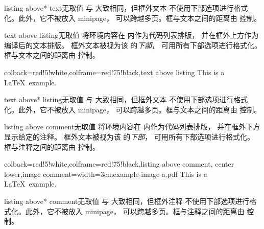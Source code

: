 \begin{docTcbKey}[][doc new=2014-11-07]{listing above* text}{}{无取值}
  与  大致相同，但框外文本
  不使用下部选项进行格式化。此外，它不被放入 minipage，
  可以跨越多页。框与文本之间的距离由  控制。
\end{docTcbKey}

\clearpage

\begin{docTcbKey}{text above listing}{}{无取值}
  将环境内容在  内作为代码列表排版，
  并在框外上方作为编译后的文本排版。
  框外文本被视为该  的\emph{下部}，
  可用所有下部选项进行格式化。
  框与文本之间的距离由  控制。
\begin{dispExample}
\begin{tcblisting}{colback=red!5!white,colframe=red!75!black,text above listing}
This is a \LaTeX\ example.
\end{tcblisting}
\end{dispExample}
\end{docTcbKey}


\begin{docTcbKey}[][doc new=2014-11-07]{text above* listing}{}{无取值}
  与  大致相同，但框外文本
  不使用下部选项进行格式化。此外，它不被放入 minipage，
  可以跨越多页。框与文本之间的距离由  控制。
\end{docTcbKey}



\begin{docTcbKey}{listing above comment}{}{无取值}
  将环境内容在  内作为代码列表排版，
  并在框外下方显示给定的注释。
  框外文本被视为该  的\emph{下部}，
  可用所有下部选项进行格式化。
  框与注释之间的距离由  控制。
\begin{dispExample}
\begin{tcblisting}{colback=red!5!white,colframe=red!75!black,listing above comment,
  center lower,image comment={width=3cm}{example-image-a.pdf}}
This is a \LaTeX\ example.
\end{tcblisting}
\end{dispExample}
\end{docTcbKey}


\begin{docTcbKey}[][doc new=2014-11-07]{listing above* comment}{}{无取值}
  与  大致相同，但框外注释
  不使用下部选项进行格式化。此外，它不被放入 minipage，
  可以跨越多页。框与注释之间的距离由  控制。
\end{docTcbKey}

